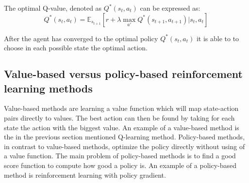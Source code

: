 




The optimal Q-value, denoted as $Q^* (s_t, a_t)$ can be expressed as:
\begin{equation} \label{eq:1}
Q^* (s_t, a_t) = \mathbb{E}_{s_{t+1}} [r + \lambda \max_{a'} Q^*(s_{t+1}, a_{t+1}) | s_t, a_t]
\end{equation}

After the agent has converged to the optimal policy $Q^* (s_t, a_t)$ it is able to to choose in each possible state the optimal action.\\







\subsection{Value-based versus policy-based reinforcement learning methods}

Value-based methods are learning a value function which will map state-action pairs directly to values. The best action can then be found by taking for each state the action with the biggest value. 
An example of a value-based method is the in the previous section mentioned Q-learning method.
Policy-based methods, in contrast to value-based methods, optimize the policy directly without using of a value function.
The main problem of policy-based methods is to find a good score function to compute how good a policy is. An example of a policy-based method is reinforcement learning with policy gradient.

